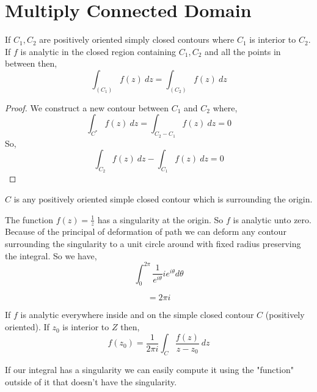 \section{Multiply Connected Domain}

\begin{corollary}
   If $C_1, C_2$ are positively oriented simply closed contours where $C_1$ is interior to $C_2$. If $f$ is analytic in the closed region containing $C_1,C_2$ and all the points in between then, 
   $$ \int_(C_1) f(z) \:dz = \int_(C_2) f(z) \:dz $$ 
\end{corollary}


\begin{proof}
   We construct a new contour between $C_1$ and $C_2$ where, 
   $$ \int_{C^*} f(z) \:dz = \int_{C_2 - C_1}f(z) \:dz = 0 $$  So, 
   $$ \int_{C_2} f(z) \:dz - \int_{C_1}f(z) \:dz = 0 $$ 
\end{proof}



\begin{eg}
   $C$ is any positively oriented simple closed contour which is surrounding the origin. 
\end{eg}

The function $f(z) = \frac{1}{z}$ has a singularity at the origin. So $f$ is analytic unto zero. Because of the principal of deformation of path we can deform any contour surrounding the singularity to a unit circle around with fixed radius preserving the integral. So we have, 
$$ \int_0^{2\pi} \frac{1}{e^{i\theta}}i e^{i\theta}d\theta $$ 

$$= 2\pi i $$ 


\begin{theorem}
   If $f$ is analytic everywhere inside and on the simple closed contour $C$ (positively oriented). If $z_0$ is interior to $Z$ then, 
   $$ f(z_0) = \frac{1}{2\pi i} \int_C \frac{f(z)}{z - z_0}\:dz$$ 
\end{theorem}
\begin{remark}
   If our integral has a singularity we can easily compute it using the "function" outside of it that doesn't have the singularity.
\end{remark}

